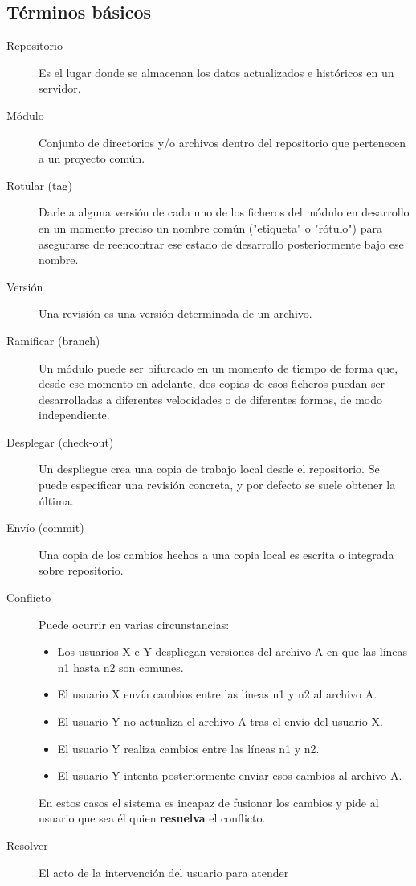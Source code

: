 \subsection{Términos básicos}
\begin{description}
\item [Repositorio] Es el lugar donde se almacenan los datos
  actualizados e históricos en un servidor.
\item [Módulo] Conjunto de directorios y/o archivos dentro del
  repositorio que pertenecen a un proyecto común. 
\item [Rotular (tag)] Darle a alguna versión de cada uno de los
  ficheros del módulo en desarrollo en un momento preciso un nombre
  común ("etiqueta" o "rótulo") para asegurarse de reencontrar ese
  estado de desarrollo posteriormente bajo ese nombre. 
\item [Versión] Una revisión es una versión determinada de un
  archivo. 
\item [Ramificar (branch)] Un módulo puede ser bifurcado en un momento
  de tiempo de forma que, desde ese momento en adelante, dos copias de
  esos ficheros puedan ser desarrolladas a diferentes velocidades o de
  diferentes formas, de modo independiente. 
\item [Desplegar (check-out)] Un despliegue crea una copia de trabajo
  local desde el repositorio. Se puede especificar una revisión
  concreta, y por defecto se suele obtener la última. 
\item [Envío (commit)] Una copia de los cambios hechos a una copia
  local es escrita o integrada sobre repositorio. 
\item [Conflicto] Puede ocurrir en varias circunstancias:
\begin{itemize}
\item Los usuarios X e Y despliegan versiones del archivo A en que las
  líneas n1 hasta n2 son comunes. 
\item El usuario X envía cambios entre las líneas n1 y n2 al archivo A.
\item El usuario Y no actualiza el archivo A tras el envío del usuario X.
\item El usuario Y realiza cambios entre las líneas n1 y n2.
\item El usuario Y intenta posteriormente enviar esos cambios al archivo A.
\end{itemize}
En estos casos el sistema es incapaz de fusionar los cambios y pide al
usuario que sea él quien \textbf{resuelva} el conflicto. 
\item [Resolver] El acto de la intervención del usuario para atender

\end{description}
